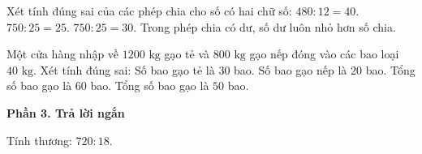 \begin{ex} %
Xét tính đúng sai của các phép chia cho số có hai chữ số:
\choiceTF
{\True $480 : 12 = 40$.}
{$750 : 25 = 25$.}
{\True $750 : 25 = 30$.}
{\True Trong phép chia có dư, số dư luôn nhỏ hơn số chia.}
\end{ex}

\begin{ex} %
Một cửa hàng nhập về $1200\text{ kg}$ gạo tẻ và $800\text{ kg}$ gạo nếp đóng vào các bao loại $40\text{ kg}$. Xét tính đúng sai:
\choiceTF
{\True Số bao gạo tẻ là $30$ bao.}
{\True Số bao gạo nếp là $20$ bao.}
{Tổng số bao gạo là $60$ bao.}
{\True Tổng số bao gạo là $50$ bao.}
\end{ex}

\textbf{Phần 3. Trả lời ngắn}

\begin{ex} %
Tính thương: $720 : 18$.
\end{ex}

